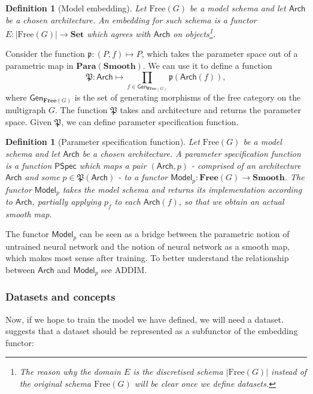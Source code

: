 \documentclass[11pt,a4paper,openright,twoside]{report}
\theoremstyle{plain}
\newtheorem{definition}[proposition]{Definition}
\theoremstyle{definition}
\begin{document}
\begin{definition}[Model embedding]
  Let $\mathrm{Free}(G)$ be a model schema and let $\mathsf{Arch}$ be a chosen architecture. An embedding for such schema is a functor $E: |\mathrm{Free}(G)| \to \mathbf{Set}$ which agrees with $\mathsf{Arch}$ on objects\footnote{The reason why the domain $E$ is the discretised schema $|\mathrm{Free}(G)|$ instead of the original schema $\mathrm{Free}(G)$ will be clear once we define datasets.}.
\end{definition}

Consider the function $\mathfrak{p}: (P,f) \mapsto P$, which takes the parameter space out of a parametric map in $\mathbf{Para}(\mathbf{Smooth})$. We can use it to define a function 
\[\mathfrak{P}: \mathsf{Arch} \mapsto \prod_{f \in \mathsf{Gen}_{\mathbf{Free}(G)}}\mathfrak{p}(\mathsf{Arch}(f)),\]
where $\mathsf{Gen}_{\mathbf{Free}(G)}$ is the set of generating morphisms of the free category on the multigraph $G$. The function $\mathfrak{P}$ takes and architecture and returns the parameter space. Given $\mathfrak{P}$, we can define parameter specification function.

\begin{definition}[Parameter specification function]
  Let $\mathrm{Free}(G)$ be a model schema and let $\mathsf{Arch}$ be a chosen architecture. A parameter specification function is a function $\mathsf{PSpec}$ which maps a pair $(\mathsf{Arch}, p)$ - comprised of an architecture $\mathsf{Arch}$ and some $p \in \mathfrak{P}(\mathsf{Arch})$ - to a functor $\mathsf{Model}_p: \mathbf{Free}(G) \to \mathbf{Smooth}$. The functor $\mathsf{Model}_p$ takes the model schema and returns its implementation according to $\mathsf{Arch}$, partially applying $p_f$ to each $\mathsf{Arch}(f)$, so that we obtain an actual smooth map. 
\end{definition}

The functor $\mathsf{Model}_p$ can be seen as a bridge between the parametric notion of untrained neural network and the notion of neural network as a smooth map, which makes most sense after training. To better understand the relationship between $\mathsf{Arch}$ and $\mathsf{Model}_p$ see ADDIM.

\subsubsection{Datasets and concepts}

Now, if we hope to train the model we have defined, we will need a dataset. \cite{gavranovicLearningFunctorsUsing2020} suggests that a dataset should be represented as a subfunctor of the embedding functor:
\end{document}
